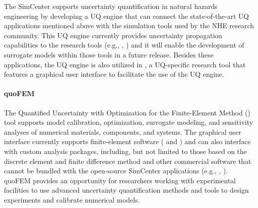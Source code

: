 The SimCenter supports uncertainty quantification in natural hazards engineering by developing a UQ engine that can connect the state-of-the-art UQ applications mentioned above with the simulation tools used by the NHE research community. This UQ engine currently provides uncertainty propagation capabilities to the research tools (e.g., , ) and it will enable the development of surrogate models within those tools in a future release. Besides these applications, the UQ engine is also utilized in , a UQ-specific research tool that features a graphical user interface to facilitate the use of the UQ engine. 

\paragraph{quoFEM} The Quantified Uncertainty with Optimization for the Finite-Element Method () tool supports model calibration, optimization, surrogate modeling, and sensitivity analyses of numerical materials, components, and systems. The graphical user interface currently supports finite-element software ( and ) and can also interface with custom analysis packages, including, but not limited to those based on the discrete element and finite difference method and other commercial software that cannot be bundled with the open-source SimCenter applications (e.g., , ). quoFEM provides an opportunity for researchers working with experimental facilities to use advanced uncertainty quantification methods and tools to design experiments and calibrate numerical models.
